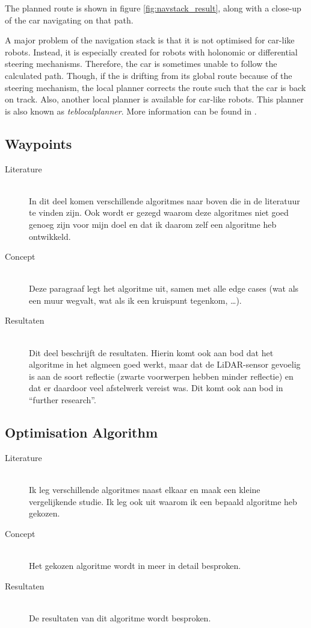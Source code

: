 \documentclass[conference,a4paper]{IEEEtran}
\begin{document}
The planned route is shown in figure \ref{fig:navstack_result}, along with a close-up of the car navigating on that path. 

A major problem of the navigation stack is that it is not optimised for car-like robots. Instead, it is especially created for robots with holonomic or differential steering mechanisms. Therefore, the car is sometimes unable to follow the calculated path. Though, if the is drifting from its global route because of the steering mechanism, the local planner corrects the route such that the car is back on track. Also, another local planner is available for car-like robots. This planner is also known as \emph{teb\textunderscore local\textunderscore planner}. More information can be found in \cite{Rosmann2016}.



\subsection{Waypoints}
\begin{description}
\item[Literature] \hfill \\ In dit deel komen verschillende algoritmes naar boven die in de literatuur te vinden zijn. Ook wordt er gezegd waarom deze algoritmes niet goed genoeg zijn voor mijn doel en dat ik daarom zelf een algoritme heb ontwikkeld.

\item[Concept] \hfill \\ Deze paragraaf legt het algoritme uit, samen met alle edge cases (wat als een muur wegvalt, wat als ik een kruispunt tegenkom, \ldots).

\item[Resultaten] \hfill \\ Dit deel beschrijft de resultaten. Hierin komt ook aan bod dat het algoritme in het algmeen goed werkt, maar dat de LiDAR-sensor gevoelig is aan de soort reflectie (zwarte voorwerpen hebben minder reflectie) en dat er daardoor veel afstelwerk vereist was. Dit komt ook aan bod in “further research”.

\end{description}

\subsection{Optimisation Algorithm}
\begin{description}
\item[Literature] \hfill \\ Ik leg verschillende algoritmes naast elkaar en maak een kleine vergelijkende studie. Ik leg ook uit waarom ik een bepaald algoritme heb gekozen.

\item[Concept] \hfill \\ Het gekozen algoritme wordt in meer in detail besproken.

\item[Resultaten] \hfill \\ De resultaten van dit algoritme wordt besproken.

\end{description}
\end{document}
